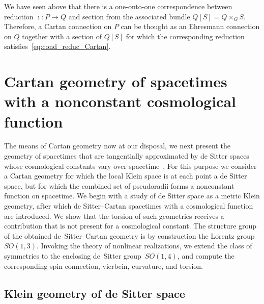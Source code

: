 \documentclass[
final,
11pt,
a4paper,
DIV=11,
headinclude=true,
footinclude=false,
bibliography=totoc,
twoside=true,  %
BCOR=5mm
]{scrbook}
\begin{document}
We have seen above that there is a one-onto-one correspondence 
between reduction $\imath : P \to Q$ and section from the 
associated bundle $Q[S] = Q \times_G S$. Therefore, a Cartan 
connection on $P$ can be thought as an Ehresmann connection on 
$Q$ together with a section of $Q[S]$ for which the corresponding 
reduction satisfies~\eqref{eq:cond_reduc_Cartan}.


\chapter{Cartan geometry of spacetimes with a nonconstant 
  cosmological function}
\label{ch:dSC_geometry}

The means of Cartan geometry now at our disposal, we next present 
the geometry of spacetimes that are tangentially approximated by 
de Sitter spaces whose cosmological constants vary over 
spacetime~\cite{Jennen:2014mba}. For this purpose we consider 
a Cartan geometry for which the local Klein space is at each 
point a de Sitter space, but for which the combined set of 
pseudoradii forms a nonconstant function on spacetime.  We begin 
with a study of de Sitter space as a metric Klein geometry, after 
which de Sitter--Cartan spacetimes with a cosmological function 
are introduced. We show that the torsion of such geometries 
receives a contribution that is not present for a cosmological 
constant.  The structure group of the obtained de~Sitter--Cartan 
geometry is by construction the Lorentz group~$SO(1,3)$.  
Invoking the theory of nonlinear realizations, we extend the 
class of symmetries to the enclosing de~Sitter group~$SO(1,4)$, 
and compute the corresponding spin connection, vierbein, 
curvature, and torsion.

\section{Klein geometry of de Sitter space}
\label{sec:Klein_dS_space}
\end{document}
